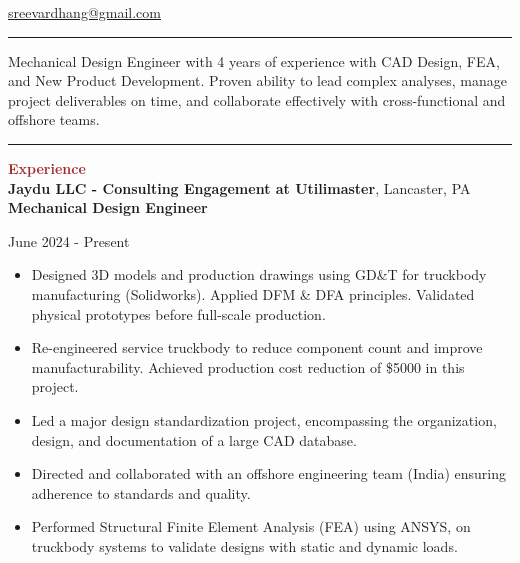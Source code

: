 \documentclass[11pt, letterpaper]{article}
\begin{document}
\begin{centering}
{\hfill{}\hfill}
\end{centering}
\begin{flushleft}
{\href{mailto:sreevardhang@gmail.com}{sreevardhang@gmail.com}}\hfill{} \hfill \raggedright{\href{https://www.linkedin.com/in/sreevardhang/}{}}
\end{flushleft}
\vspace{-8pt}
\noindent \rule[2pt]{\textwidth}{0.5pt} \vspace{-8mm}
\begin{justify} 
Mechanical Design Engineer with 4 years of experience with CAD Design, FEA, and New Product 
Development. Proven ability to lead complex analyses, manage project deliverables on time, and collaborate effectively with cross-functional 
and offshore teams.\end{justify} 
\vspace{-8pt}
\noindent \rule[2pt]{\textwidth}{0.5pt}
\noindent \textbf{\large \textcolor{Brown}{Experience}}\vspace{4pt}\\
\textbf{Jaydu LLC - Consulting Engagement at Utilimaster}, Lancaster, PA\\ 
\textbf{Mechanical Design Engineer}\hfill \raggedright{June 2024 - Present}\\
\begin{itemize}[leftmargin=*]
\setlength\itemsep{-2pt}
\vspace{-8pt}
\item Designed 3D models and production drawings using GD\&T for truckbody manufacturing (Solidworks). Applied DFM \& DFA principles. Validated physical prototypes before full-scale production. 
\item Re-engineered service  truckbody to reduce component count and improve manufacturability. Achieved production cost reduction of \$5000 in this project.
\item Led a major design standardization project, encompassing the organization, design, and documentation of a large CAD database.
\item Directed and collaborated with an offshore engineering team (India) ensuring adherence to standards and quality.
\item Performed Structural Finite Element Analysis (FEA) using ANSYS, on truckbody systems to validate designs with static and dynamic loads.
\end{itemize}\vspace{-8pt}
\end{document}
